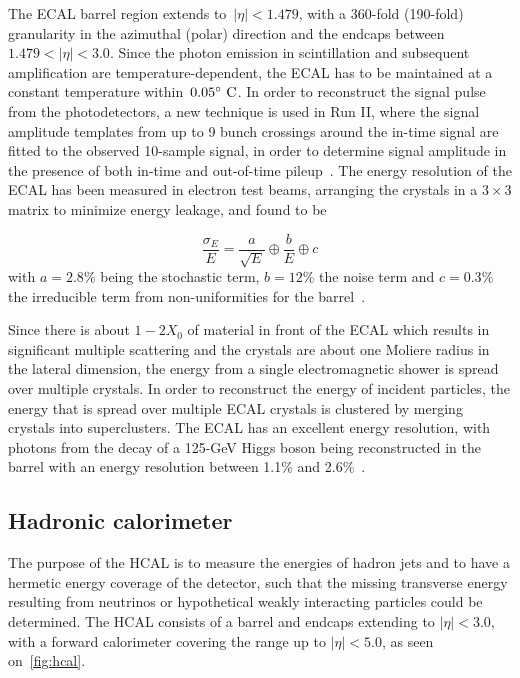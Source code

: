 The ECAL barrel region extends to~$|\eta| < 1.479$, with a 360-fold (190-fold) granularity in the azimuthal (polar) direction and the endcaps between~$1.479 < |\eta| < 3.0$. Since the photon emission in scintillation and subsequent amplification are temperature-dependent, the ECAL has to be maintained at a constant temperature within~$0.05\degree~\mathrm{C}$. In order to reconstruct the signal pulse from the photodetectors, a new technique is used in Run II, where the signal amplitude templates from up to 9 bunch crossings around the in-time signal are fitted to the observed 10-sample signal, in order to determine signal amplitude in the presence of both in-time and out-of-time pileup~\cite{Brianza:2017slq}. The energy resolution of the ECAL has been measured in electron test beams, arranging the crystals in a $3\times3$ matrix to minimize energy leakage, and found to be

\begin{equation}
\frac{\sigma_E}{E} = \frac{a}{\sqrt{E}} \oplus \frac{b}{E} \oplus c
\end{equation}
with $a = 2.8\%$ being the stochastic term, $b = 12\%$ the noise term and $c = 0.3\%$ the irreducible term from non-uniformities for the barrel~\cite{Adzic:2007mi}.

Since there is about $1-2X_0$ of material in front of the ECAL which results in significant multiple scattering and the crystals are about one Moliere radius in the lateral dimension, the energy from a single electromagnetic shower is spread over multiple crystals. In order to reconstruct the energy of incident particles, the energy that is spread over multiple ECAL crystals is clustered by merging crystals into superclusters. The ECAL has an excellent energy resolution, with photons from the decay of a 125-GeV Higgs boson being reconstructed in the barrel with an energy resolution between 1.1\% and 2.6\%~\cite{Chatrchyan:2013dga}.

\subsection{Hadronic calorimeter}
The purpose of the HCAL is to measure the energies of hadron jets and to have a hermetic energy coverage of the detector, such that the missing transverse energy resulting from neutrinos or hypothetical weakly interacting particles could be determined. The HCAL consists of a barrel and endcaps extending to $|\eta| < 3.0$, with a forward calorimeter covering the range up to $|\eta|<5.0$, as seen on~\cref{fig:hcal}.

